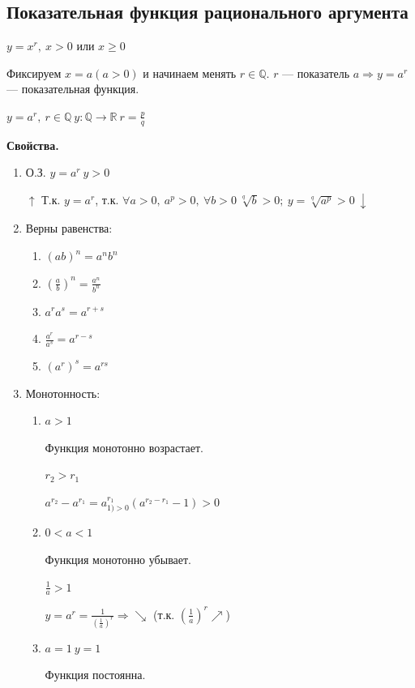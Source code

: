 \documentclass{article}
\begin{document}
    \subsection{Показательная функция рационального аргумента}

    \( y = x^r,\ x > 0 \textrm{ или } x \geq 0\)

    Фиксируем \( x = a (a > 0)\) и начинаем менять \(r \in \mathbb{Q}\). \(r\) --- показатель \(a \Rightarrow y = a^r\) --- показательная функция.

    \(y = a^r,\ r \in \mathbb{Q}\ y: \mathbb{Q} \rightarrow \mathbb{R}\ r = \frac{p}{q}\)

    \textbf{Свойства.}
    
    \begin{enumerate}
        \item О.З. \(y = a^r\ y > 0\)
        
        \(\uparrow\) Т.к. \(y=a^r\), т.к. \(\forall a > 0,\ a^p > 0,\ \forall b > 0\ \sqrt[q]{b} > 0;\ y = \sqrt[q]{a^p} > 0\ \downarrow\)
        
        \item Верны равенства:
        \begin{enumerate}
            \item \( (ab)^n = a^nb^n \)
            \item \( (\frac{a}{b})^n = \frac{a^n}{b^n} \)
            \item \( a^ra^s = a^{r+s} \)
            \item \( \frac{a^r}{a^s} = a^{r-s} \)
            \item \( (a^r)^s = a^{rs} \)
        \end{enumerate}
        \item Монотонность:
        \begin{enumerate}
            \item \(a > 1\)

            Функция монотонно возрастает.
            
            \(r_2 > r_1\)

            \(a^{r_2} - a^{r_1} = a^{r_1}_{1) > 0}(a^{r_2-r_1} - 1) > 0\)
            
            \item \( 0 < a < 1 \)
            
            Функция монотонно убывает.

            \( \frac{1}{a} > 1\)

            \( y = a^r = \frac{1}{(\frac{1}{a})^r} \Rightarrow \searrow\) (т.к. \((\frac{1}{a})^r \nearrow \))

            \item \(a = 1\ y = 1\)
            
            Функция постоянна.
        \end{enumerate}
    \end{enumerate}
    
\end{document}
